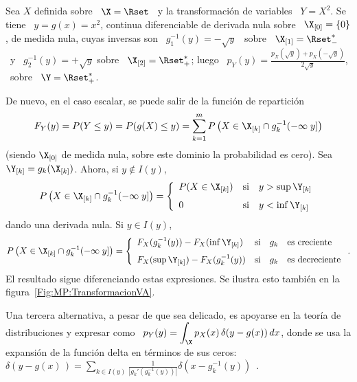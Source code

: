 \begin{ejemplo}
\label{Ej:MP:TransformacionNoBiyectiva}
%
  Sea $X$ definida sobre  \ $\X = \Rset$ \ y la  transformaci\'on de variables \
  $Y = X^2$.   Se tiene \ $y  = g(x) = x^2$, continua  diferenciable de derivada
  nula  sobre \  $\X_{[0]} =  \{ 0  \}$, de  medida nula,  cuyas inversas  son \
  $g_1^{-1}(y) = - \sqrt{y}$ \ sobre \ $\X_{[1]} = \Rset_-^*$ \ y \ $g_2^{-1}(y)
  =  +   \sqrt{y}$  sobre   \  $\X_{[2]}  =   \Rset_+^*$;  luego  \   $p_Y(y)  =
  \frac{p_X(\sqrt{y})  +   p_X(-\sqrt{y})}{2  \sqrt{y}}$,   \  sobre  \   $\Y  =
  \Rset_+^*$.
\end{ejemplo}

De nuevo, en el caso escalar, se puede salir de la funci\'on de repartici\'on
%
\[
F_Y(y) =  P(Y \le y) = P(  g(X) \le y )  = \sum_{k=1}^m P\left( X  \in \X_{[k]} \cap
  g_k^{-1}(-\infty \; y] \right)
\]
%
(siendo  $\X_{[0]}$  de medida  nula,  sobre  este  dominio la  probabilidad  es
cero). Sea $\Y_{[k]} = g_k(\X_{[k]})$. Ahora, si $y \notin I(y)$,
%
\[
P\left(   X   \in  \X_{[k]}   \cap   g_k^{-1}(-\infty  \;   y]  \right)   =
\left\{\begin{array}{lll}
%
P(X \in \X_{[k]}) & \mbox{si} & y > \sup \Y_{[k]}\\[2.5mm]
%
0 & \mbox{si} & y < \inf \Y_{[k]}
\end{array}\right.
\]
%
dando una derivada nula. Si $y \in I(y)$,
%
\[
P\left(   X   \in  \X_{[k]}   \cap   g_k^{-1}(-\infty  \;   y]  \right)   =
\left\{\begin{array}{lll}
%
F_X(g_k^{-1}(y)) - F_X(\inf \Y_{[k]}) & \mbox{si} & g_k \quad \mbox{es creciente}\\[2.5mm]
%
F_X(\sup \Y_{[k]}) - F_X(g_k^{-1}(y))  & \mbox{si} & g_k \quad \mbox{es decreciente}
\end{array}\right..
\]
%
El resultado sigue diferenciando estas expresiones. Se ilustra esto tambi\'en en
la figura~\ref{Fig:MP:TransformacionVA}.

Una tercera alternativa, a pesar de que sea delicado, es apoyarse en la teor\'ia
de distribuciones  y expresar como \  $\displaystyle p_Y(y) =  \int_\X p_X(x) \,
\delta(y-g(x)) \,  dx$, donde  se usa  la expansi\'on de  la funci\'on  delta en
t\'erminos de sus ceros:  \ $\delta(y-g(x)\,)= \sum_{k \in I(y)} \frac{1}{\left|
    g_k'\left(          g_k^{-1}          (y)          \right)          \right|}
\delta(x-g_k^{-1}(y))$~\cite{ManWol95}.

